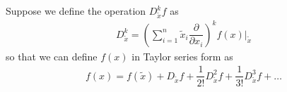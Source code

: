 %
Suppose we define the operation $D^k_{\tilde{x}}f$ as 
%
\begin{align}
	D^k_{\tilde{x}} = \left(\sum_{i=1}^{n} \tilde{x}_i \dfrac{\partial}{\partial x_i}\right)^k f(x) \bigg \rvert_{\tilde{x}}
\end{align}
%
so that we can define $f(x)$ in Taylor series form as 
%
\begin{align}
	f(x) = f(\tilde{x}) + D_{\tilde{x}} f + \dfrac{1}{2!} D^2_{\tilde{x}} f + \dfrac{1}{3!} D^3_{\tilde{x}} f + \ldots
\end{align}